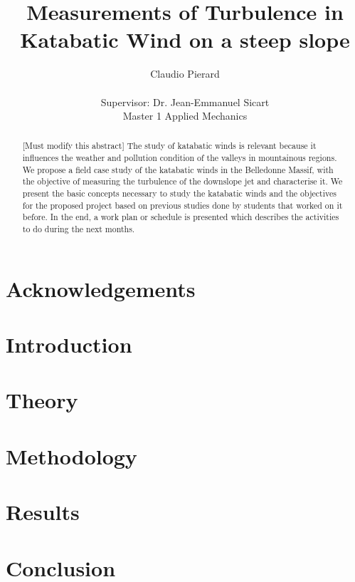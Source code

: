\documentclass[a4paper, 12pt, twoside]{article}
\title{Measurements of Turbulence in Katabatic Wind on a steep slope}
\author{Claudio Pierard \\
\\
Supervisor: Dr. Jean-Emmanuel Sicart
\\
Master 1 Applied Mechanics\\}
\begin{document}
\renewcommand{\labelitemi}{$\bullet$}

\maketitle

\empty

\begin{abstract}
[Must modify this abstract] The study of katabatic winds is relevant because it influences the weather and pollution condition of the valleys in mountainous regions. We propose a field case study of the katabatic winds in the Belledonne Massif, with the objective of measuring the turbulence of the downslope jet and characterise it. We present the basic concepts necessary to study the katabatic winds and the objectives for the proposed project based on previous studies done by students that worked on it before. In the end, a work plan or schedule is presented which describes the activities to do during the next months.
   
\end{abstract}

\newpage

\section*{Acknowledgements}

\newpage

\tableofcontents
\newpage
\listoffigures
\listoftables

\newpage

\section{Introduction}


\section{Theory}


\section{Methodology} \label{sec:methodology}


\section{Results}


\section{Conclusion}


\clearpage


\end{document}
